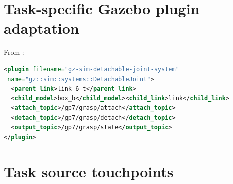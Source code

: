 \section{Task-specific Gazebo plugin adaptation}
From :
\begin{lstlisting}[language=XML,caption={Object retention uses a Gazebo detachable joint.}]
<plugin filename="gz-sim-detachable-joint-system"
 name="gz::sim::systems::DetachableJoint">
  <parent_link>link_6_t</parent_link>
  <child_model>box_b</child_model><child_link>link</child_link>
  <attach_topic>/gp7/grasp/attach</attach_topic>
  <detach_topic>/gp7/grasp/detach</detach_topic>
  <output_topic>/gp7/grasp/state</output_topic>
</plugin>
\end{lstlisting}

\section{Task source touchpoints}
